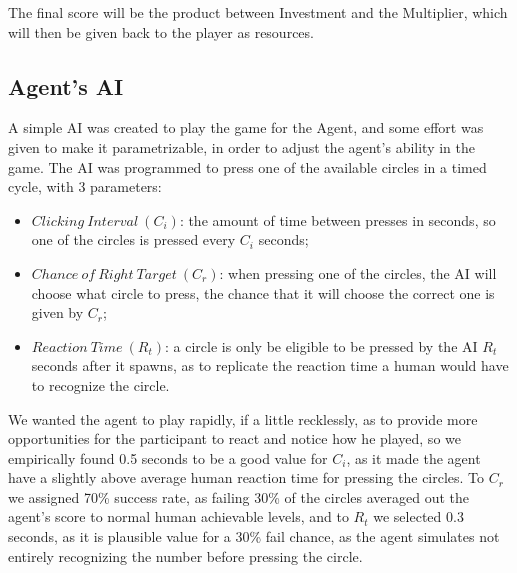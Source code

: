 The final score will be the product between Investment and the Multiplier, which will then be given back to the player as resources.





\subsection{Agent's \ac{AI}}
A simple \ac{AI} was created to play the game for the Agent, and some effort was given to make it parametrizable, in order to adjust the agent's ability in the game. The \ac{AI} was programmed to press one of the available circles in a timed cycle, with 3 parameters:
\begin{itemize}
    \item $Clicking\ Interval\ (C_i)$: the amount of time between presses in seconds, so one of the circles is pressed every $C_i$ seconds;
    \item $Chance\ of\ Right\ Target\ (C_r)$: when pressing one of the circles, the \ac{AI} will choose what circle to press, the chance that it will choose the correct one is given by $C_r$;
    \item $Reaction\ Time\ (R_t)$: a circle is only be eligible to be pressed by the \ac{AI} $R_t$ seconds after it spawns, as to replicate the reaction time a human would have to recognize the circle.
\end{itemize}

We wanted the agent to play rapidly, if a little recklessly, as to provide more opportunities for the participant to react and notice how he played, so we empirically found 0.5 seconds to be a good value for $C_i$, as it made the agent have a slightly above average human reaction time for pressing the circles. To $C_r$ we assigned 70\% success rate, as failing 30\% of the circles averaged out the agent's score to normal human achievable levels, and to $R_t$ we selected 0.3 seconds, as it is plausible value for a 30\% fail chance, as the agent simulates not entirely recognizing the number before pressing the circle.

